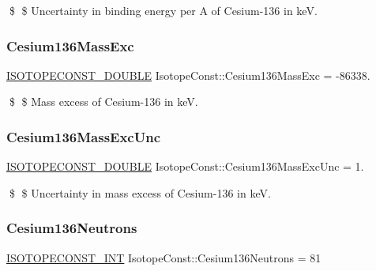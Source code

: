 \$ \$ Uncertainty in binding energy per A of Cesium-\/136 in keV. \mbox{\label{group___isotope_const-_cesium-_cs136_ga9943d05d50dad9783f789695b9b8d2ac}} 
\subsubsection{\texorpdfstring{Cesium136\+Mass\+Exc}{Cesium136MassExc}}
{\footnotesize\ttfamily \mbox{\hyperlink{group___isotope_const-_macros_ga8f45a7272ce02c0b4c65c44636ed719a}{I\+S\+O\+T\+O\+P\+E\+C\+O\+N\+S\+T\+\_\+\+D\+O\+U\+B\+LE}} Isotope\+Const\+::\+Cesium136\+Mass\+Exc = -\/86338.}

\$ \$ Mass excess of Cesium-\/136 in keV. \mbox{\label{group___isotope_const-_cesium-_cs136_ga5fe10033bb56f53ca2763a59e1e60c7d}} 
\subsubsection{\texorpdfstring{Cesium136\+Mass\+Exc\+Unc}{Cesium136MassExcUnc}}
{\footnotesize\ttfamily \mbox{\hyperlink{group___isotope_const-_macros_ga8f45a7272ce02c0b4c65c44636ed719a}{I\+S\+O\+T\+O\+P\+E\+C\+O\+N\+S\+T\+\_\+\+D\+O\+U\+B\+LE}} Isotope\+Const\+::\+Cesium136\+Mass\+Exc\+Unc = 1.}

\$ \$ Uncertainty in mass excess of Cesium-\/136 in keV. \mbox{\label{group___isotope_const-_cesium-_cs136_ga09e96b702dbbc3a389bc5ae329ad568b}} 
\subsubsection{\texorpdfstring{Cesium136\+Neutrons}{Cesium136Neutrons}}
{\footnotesize\ttfamily \mbox{\hyperlink{group___isotope_const-_macros_ga5f18360b3e99483a35c32d789e62621c}{I\+S\+O\+T\+O\+P\+E\+C\+O\+N\+S\+T\+\_\+\+I\+NT}} Isotope\+Const\+::\+Cesium136\+Neutrons = 81}

